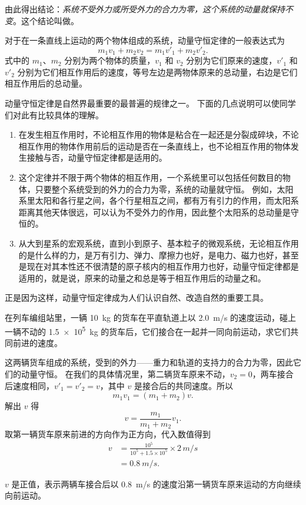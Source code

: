 由此得出结论：\emph{系统不受外力或所受外力的合力为零，这个系统的动量就保持不变}。这个结论叫做。

对于在一条直线上运动的两个物体组成的系统，动量守恒定律的一般表达式为
\[m_1v_1+m_2v_2=m_1v'_1+m_2v'_2.\]
式中的 $m_1$、$m_2$ 分别为两个物体的质量，$v_1$ 和 $v_2$ 分别为它们原来的速度，$v'_1$ 和 $v'_2$ 分别为它们相互作用后的速度，等号左边是两物体原来的总动量，右边是它们相互作用后的总动量。

动量守恒定律是自然界最重要的最普遍的规律之一。
下面的几点说明可以使同学们对此有比较具体的理解。
\begin{enumerate}
  \item 在发生相互作用时，不论相互作用的物体是粘合在一起还是分裂成碎块，不论相互作用的物体作用前后的运动是否在一条直线上，也不论相互作用的物体发生接触与否，动量守恒定律都是适用的。

  \item 这个定律并不限于两个物体的相互作用，一个系统里可以包括任何数目的物体，只要整个系统受到的外力的合力为零，系统的动量就守恒。
  例如，太阳系里太阳和各行星之间，各个行星相互之间，都有万有引力的作用，而太阳系距离其他天体很远，可以认为不受外力的作用，因此整个太阳系的总动量是守恒的。

  \item\label{itm:mv_law} 从大到星系的宏观系统，直到小到原子、基本粒子的微观系统，无论相互作用的是什么样的力，是万有引力、弹力、摩擦力也好，是电力、磁力也好，甚至是现在对其本性还不很清楚的原子核内的相互作用力也好，动量守恒定律都是适用的，就是说，原来的动量之和总是等于相互作用后的动量之和。
\end{enumerate}

正是因为这样，动量守恒定律成为人们认识自然、改造自然的重要工具。

\begin{example}
在列车编组站里，一辆 \qty{10}{kg} 的货车在平直轨道上以 \qty{2.0}{m/s} 的速度运动，碰上一辆不动的 \qty{1.5e5}{kg} 的货车后，它们接合在一起并一同向前运动，求它们共同前进的速度。
\end{example}

\begin{solution}
  这两辆货车组成的系统，受到的外力——重力和轨道的支持力的合力为零，因此它们的动量守恒。
  在我们的具体情况里，第二辆货车原来不动，$v_2=0$，两车接合后速度相同，$v'_1=v'_2=v$，其中 $v$ 是接合后的共同速度。所以
\[m_1v_1=(m_1+m_2)v.\]
解出 $v$ 得
\[v=\frac{m_1}{m_1+m_2}v_1.\]
取第一辆货车原来前进的方向作为正方向，代入数值得到
\[\begin{split}
    v&=\frac{10^5}{10^5+1.5\times 10^5}\times 2\, \unit{m/s}\\
    &=\qty{0.8}{m/s}.
\end{split}\]
\end{solution}
$v$ 是正值，表示两辆车接合后以 \qty{0.8}{m/s} 的速度沿第一辆货车原来运动的方向继续向前运动。


